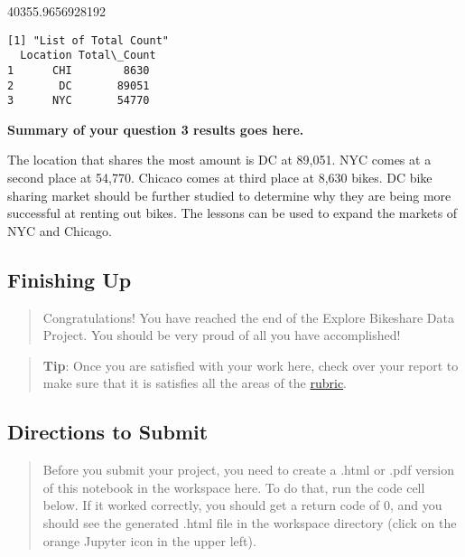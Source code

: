 \documentclass[11pt]{article}
\begin{document}
    40355.9656928192

    
    \begin{Verbatim}[commandchars=\\\{\}]
[1] "List of Total Count"
  Location Total\_Count
1      CHI        8630
2       DC       89051
3      NYC       54770

    \end{Verbatim}

    \textbf{Summary of your question 3 results goes here.}

The location that shares the most amount is DC at 89,051. NYC comes at a
second place at 54,770. Chicaco comes at third place at 8,630 bikes. DC
bike sharing market should be further studied to determine why they are
being more successful at renting out bikes. The lessons can be used to
expand the markets of NYC and Chicago.

    \hypertarget{finishing-up}{%
\subsection{Finishing Up}\label{finishing-up}}

\begin{quote}
Congratulations! You have reached the end of the Explore Bikeshare Data
Project. You should be very proud of all you have accomplished!
\end{quote}

\begin{quote}
\textbf{Tip}: Once you are satisfied with your work here, check over
your report to make sure that it is satisfies all the areas of the
\href{https://review.udacity.com/\#!/rubrics/2508/view}{rubric}.
\end{quote}

\hypertarget{directions-to-submit}{%
\subsection{Directions to Submit}\label{directions-to-submit}}

\begin{quote}
Before you submit your project, you need to create a .html or .pdf
version of this notebook in the workspace here. To do that, run the code
cell below. If it worked correctly, you should get a return code of 0,
and you should see the generated .html file in the workspace directory
(click on the orange Jupyter icon in the upper left).
\end{quote}
\end{document}
